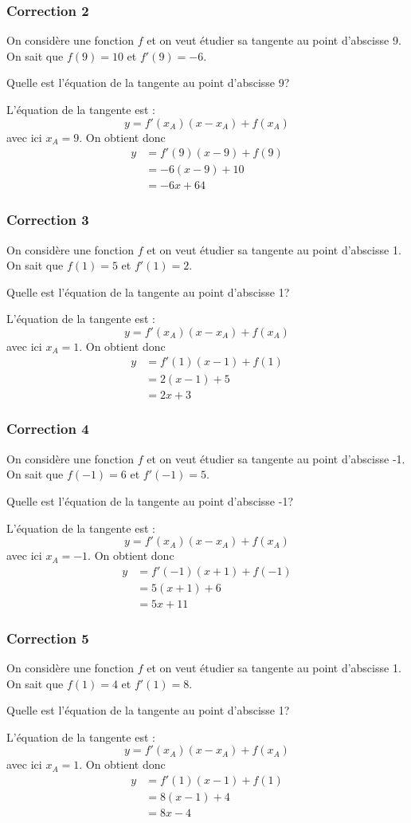\documentclass[15pt, mathserif]{beamer}
\begin{document}
\begin{frame}
\vspace{-10mm}
	\frametitle{Correction 2}
On considère une fonction $f$ et on veut étudier sa tangente au point d'abscisse 9. On sait que $f(9)=10$ et $f'(9)=-6$. 
 
  Quelle est l'équation de la tangente au point d'abscisse 9? 
 
 L'équation de la tangente est : $$y=f'(x_A)(x-x_A) + f(x_A)$$ avec ici $x_A=9$. On obtient donc 
 \begin{align*} 
 y&= f'(9)(x-9)+f(9) \\ 
 &=-6(x-9)+10\\ 
 &= -6x+64
 \end{align*}\end{frame}


\begin{frame}
\vspace{-10mm}
	\frametitle{Correction 3}
On considère une fonction $f$ et on veut étudier sa tangente au point d'abscisse 1. On sait que $f(1)=5$ et $f'(1)=2$. 
 
  Quelle est l'équation de la tangente au point d'abscisse 1? 
 
 L'équation de la tangente est : $$y=f'(x_A)(x-x_A) + f(x_A)$$ avec ici $x_A=1$. On obtient donc 
 \begin{align*} 
 y&= f'(1)(x-1)+f(1) \\ 
 &=2(x-1)+5\\ 
 &= 2x+3
 \end{align*}\end{frame}


\begin{frame}
\vspace{-10mm}
	\frametitle{Correction 4}
On considère une fonction $f$ et on veut étudier sa tangente au point d'abscisse -1. On sait que $f(-1)=6$ et $f'(-1)=5$. 
 
  Quelle est l'équation de la tangente au point d'abscisse -1? 
 
 L'équation de la tangente est : $$y=f'(x_A)(x-x_A) + f(x_A)$$ avec ici $x_A=-1$. On obtient donc 
 \begin{align*} 
 y&= f'(-1)(x+1)+f(-1) \\ 
 &=5(x+1)+6\\ 
 &= 5x+11
 \end{align*}\end{frame}


\begin{frame}
\vspace{-10mm}
	\frametitle{Correction 5}
On considère une fonction $f$ et on veut étudier sa tangente au point d'abscisse 1. On sait que $f(1)=4$ et $f'(1)=8$. 
 
  Quelle est l'équation de la tangente au point d'abscisse 1? 
 
 L'équation de la tangente est : $$y=f'(x_A)(x-x_A) + f(x_A)$$ avec ici $x_A=1$. On obtient donc 
 \begin{align*} 
 y&= f'(1)(x-1)+f(1) \\ 
 &=8(x-1)+4\\ 
 &= 8x-4
 \end{align*}\end{frame}
\end{document}
